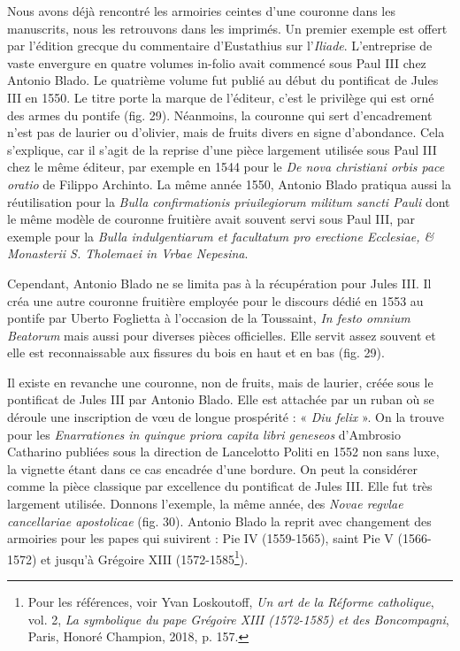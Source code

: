 \documentclass[12pt,twoside,openany]{book}
\begin{document}
Nous avons déjà rencontré les armoiries ceintes d’une couronne dans les manuscrits, nous les retrouvons dans les imprimés. Un premier exemple est offert par l’édition grecque du commentaire d’Eustathius sur l’\textit{Iliade}. L’entreprise de vaste envergure en quatre volumes in-folio avait commencé sous Paul III chez Antonio Blado. Le quatrième volume fut publié au début du pontificat de Jules III en 1550. Le titre porte la marque de l’éditeur, c’est le privilège qui est orné des armes du pontife (fig. 29). Néanmoins, la couronne qui sert d’encadrement n’est pas de laurier ou d’olivier, mais de fruits divers en signe d’abondance. Cela s’explique, car il s’agit de la reprise d’une pièce largement utilisée sous Paul III chez le même éditeur, par exemple en 1544 pour le \textit{De nova christiani orbis pace oratio} de Filippo Archinto. La même année 1550, Antonio Blado pratiqua aussi la réutilisation pour la \textit{Bulla confirmationis priuilegiorum militum sancti Pauli} dont le même modèle de couronne fruitière avait souvent servi sous Paul III, par exemple pour la \textit{Bulla indulgentiarum et facultatum pro erectione Ecclesiae, \& Monasterii S. Tholemaei in Vrbae Nepesina}.

Cependant, Antonio Blado ne se limita pas à la récupération pour Jules III. Il créa une autre couronne fruitière employée pour le discours dédié en 1553 au pontife par Uberto Foglietta à l’occasion de la Toussaint, \textit{In festo omnium Beatorum }mais aussi pour diverses pièces officielles. Elle servit assez souvent et elle est reconnaissable aux fissures du bois en haut et en bas (fig. 29).

Il existe en revanche une couronne, non de fruits, mais de laurier, créée sous le pontificat de Jules III par Antonio Blado. Elle est attachée par un ruban où se déroule une inscription de vœu de longue prospérité : « \textit{Diu felix} ». On la trouve pour les \textit{Enarrationes in quinque priora capita libri geneseos} d’Ambrosio Catharino publiées sous la direction de Lancelotto Politi en 1552 non sans luxe, la vignette étant dans ce cas encadrée d’une bordure. On peut la considérer comme la pièce classique par excellence du pontificat de Jules III. Elle fut très largement utilisée. Donnons l’exemple, la même année, des \textit{Novae regvlae cancellariae apostolicae} (fig. 30). Antonio Blado la reprit avec changement des armoiries pour les papes qui suivirent : Pie IV (1559-1565), saint Pie V (1566-1572) et jusqu’à Grégoire XIII (1572-1585\footnote{Pour les références, voir Yvan Loskoutoff, \textit{Un art de la Réforme catholique}, vol. 2, \textit{La symbolique du pape Grégoire XIII (1572-1585) et des Boncompagni}, Paris, Honoré Champion, 2018, p. 157.}).
\end{document}
